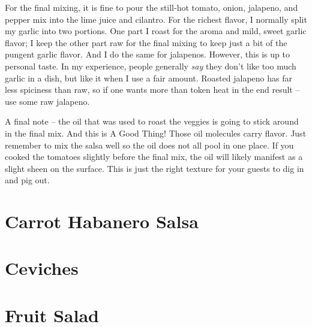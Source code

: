 For the final mixing, it is fine to pour the still-hot tomato, onion, jalapeno, and pepper mix into the lime juice and cilantro. For the richest flavor, I normally split my garlic into two portions. One part I roast for the aroma and mild, sweet garlic flavor; I keep the other part raw for the final mixing to keep just a bit of the pungent garlic flavor. And I do the same for jalapenos. However, this is up to personal taste. In my experience, people generally \textit{say} they don't like too much garlic in a dish, but like it when I use a fair amount. Roasted jalapeno has far less spiciness than raw, so if one wants more than token heat in the end result -- use some raw jalapeno.

A final note -- the oil that was used to roast the veggies is going to stick around in the final mix. And this is A Good Thing! Those oil molecules carry flavor.  Just remember to mix the salsa well so the oil does not all pool in one place. If you cooked the tomatoes slightly before the final mix, the oil will likely manifest as a slight sheen on the surface. This is just the right texture for your guests to dig in and pig out.

\newpage  \section{Carrot Habanero Salsa}

\newpage \section{Ceviches}

\newpage \section{Fruit Salad}



